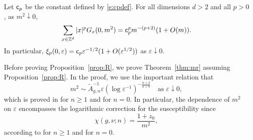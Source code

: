 \begin{prop}\label{prop:Gab-free-moment-estimate}
Let ${\sf c}_p$ be the constant defined by \eqref{e:cpdef}.
For all dimensions $d>2$ and all $p>0$,
as $m^2 \downarrow 0$,
\begin{equation}
\label{e:Gab-free-moment-estimate}
\sum_{x\in{ {{\mathbb Z}}^d }} |x|^p G_{x}(0, m^2)
=
{\sf c}_p^p m^{-(p + 2)} (1 + O(m)).
\end{equation}
In particular, $\xi_p(0,\varepsilon) = {\sf c}_p \varepsilon^{-1/2}
(1+O(\varepsilon^{1/2}))$ as $\varepsilon \downarrow 0$.
\end{prop}

Before proving Proposition~\ref{prop:R}, we
prove Theorem~\ref{thm:mr} assuming Proposition~\ref{prop:R}.
In the proof, we use the important relation
that
\begin{equation}
\label{e:mass-epsilon-asympt}
 m^2
 \sim \tilde A_{g,n}^{-1} \varepsilon (\log \varepsilon^{-1})^{-\frac{n + 2}{n + 8}}
\quad \text{as $\varepsilon \downarrow 0$},
\end{equation}
which is proved in \cite[\eqref{phi4-log-e:masymp}]{BBS-phi4-log} for $n\geq 1$
and \cite[\eqref{log-e:m-mu}]{BBS-saw4-log} for $n=0$.
In particular, the dependence of $m^2$ on $\varepsilon$
encompasses the logarithmic correction for the susceptibility since
\begin{equation}\label{e:susceptibility-mass-identity}
\chi(g,\nu; n) = \frac{1 + z_0}{m^2},
\end{equation}
according to \cite[\eqref{phi4-log-e:chim2}]{BBS-phi4-log} for $n\geq 1$
and \cite[\eqref{log-e:chi-mtil0}]{BBS-saw4-log} for $n=0$.

